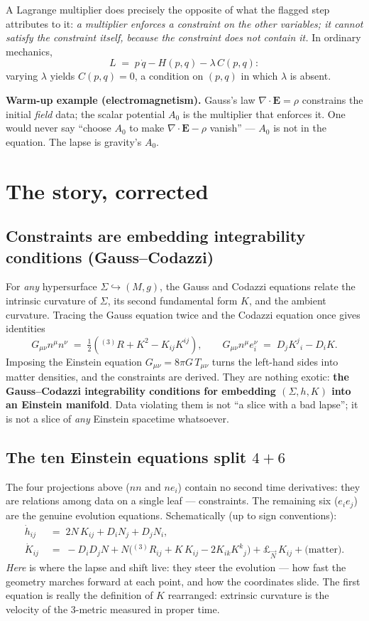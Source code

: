 \documentclass[11pt]{article}
\newcommand{\Rthree}{{}^{(3)}\!R}
\newcommand{\Lie}{\pounds}
\begin{document}
A Lagrange multiplier does precisely the opposite of what the flagged step attributes to
it: \emph{a multiplier enforces a constraint on the other variables; it cannot satisfy the
constraint itself, because the constraint does not contain it.} In ordinary mechanics,
\[
L \;=\; p\,\dot q - H(p,q) - \lambda\, C(p,q):
\]
varying $\lambda$ yields $C(p,q) = 0$, a condition on $(p,q)$ in which $\lambda$ is
absent.

\textbf{Warm-up example (electromagnetism).} Gauss's law $\nabla\!\cdot\!\mathbf{E} = \rho$
constrains the initial \emph{field} data; the scalar potential $A_0$ is the multiplier
that enforces it. One would never say ``choose $A_0$ to make
$\nabla\!\cdot\!\mathbf{E}-\rho$ vanish'' --- $A_0$ is not in the equation. The lapse is
gravity's $A_0$.

\section{The story, corrected}

\subsection{Constraints are embedding integrability conditions (Gauss--Codazzi)}

For \emph{any} hypersurface $\Sigma \hookrightarrow (M,g)$, the Gauss and Codazzi
equations relate the intrinsic curvature of $\Sigma$, its second fundamental form $K$,
and the ambient curvature. Tracing the Gauss equation twice and the Codazzi equation once
gives identities
\[
G_{\mu\nu}n^\mu n^\nu \;=\; \tfrac12\!\left(\Rthree + K^2 - K_{ij}K^{ij}\right),
\qquad
G_{\mu\nu}n^\mu e^\nu_i \;=\; D_jK^j{}_i - D_iK .
\]
Imposing the Einstein equation $G_{\mu\nu} = 8\pi G\,T_{\mu\nu}$ turns the left-hand
sides into matter densities, and the constraints are derived. They are nothing exotic:
\textbf{the Gauss--Codazzi integrability conditions for embedding $(\Sigma,h,K)$ into an
Einstein manifold}. Data violating them is not ``a slice with a bad lapse''; it is not a
slice of \emph{any} Einstein spacetime whatsoever.

\subsection{The ten Einstein equations split $4+6$}

The four projections above ($nn$ and $ne_i$) contain no second time derivatives: they are
relations among data on a single leaf --- constraints. The remaining six ($e_ie_j$) are
the genuine evolution equations. Schematically (up to sign conventions):
\begin{align}
\dot h_{ij} &\;=\; 2N\,K_{ij} + D_iN_j + D_jN_i ,\\
\dot K_{ij} &\;=\; -D_iD_jN
+ N\big(\Rthree_{ij} + K\,K_{ij} - 2K_{ik}K^k{}_j\big)
+ \Lie_{\vec N}\,K_{ij} + \text{(matter)} .
\end{align}
\emph{Here} is where the lapse and shift live: they steer the evolution --- how fast the
geometry marches forward at each point, and how the coordinates slide. The first equation
is really the definition of $K$ rearranged: extrinsic curvature is the velocity of the
3-metric measured in proper time.
\end{document}
